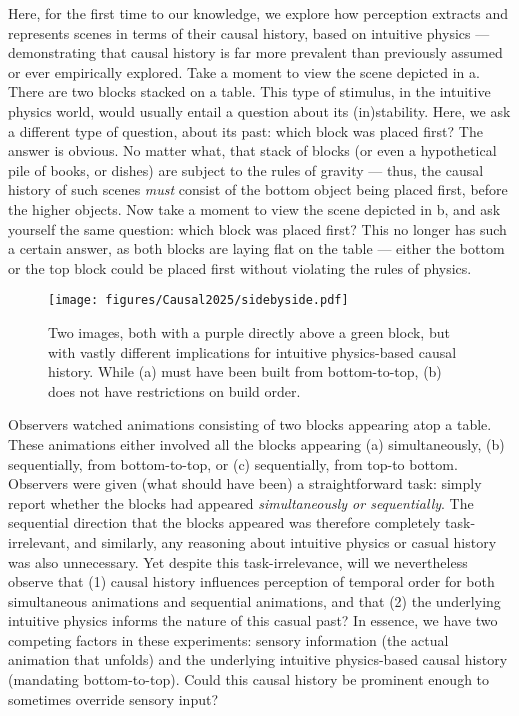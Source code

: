 Here, for the first time to our knowledge, we explore how perception extracts and represents scenes in terms of their causal history, based on intuitive physics --- demonstrating that causal history is far more prevalent than previously assumed or ever empirically explored.  Take a moment to view the scene depicted in a.  There are two blocks stacked on a table.  This type of stimulus, in the intuitive physics world, would usually entail a question about its (in)stability.  Here, we ask a different type of question, about its past: which block was placed first?  The answer is obvious.  No matter what, that stack of blocks (or even a hypothetical pile of books, or dishes) are subject to the rules of gravity --- thus, the causal history of such scenes \textit{must} consist of the bottom object being placed first, before the higher objects.  Now take a moment to view the scene depicted in b, and ask yourself the same question: which block was placed first?  This no longer has such a certain answer, as both blocks are laying flat on the table --- either the bottom or the top block could be placed first without violating the rules of physics.  

\begin{figure}
    \centering
    \texttt{[image: figures/Causal2025/sidebyside.pdf]}
    \caption
    {Two images, both with a purple directly above a green block, but with vastly different implications for intuitive physics-based causal history.  While (a) must have been built from bottom-to-top, (b) does not have restrictions on build order.}
    \label{fig:CausalHist_2}
\end{figure}

Observers watched animations consisting of two blocks appearing atop a table.  These animations either involved all the blocks appearing (a) simultaneously, (b) sequentially, from bottom-to-top, or (c) sequentially, from top-to bottom.  Observers were given (what should have been) a straightforward task:  simply report whether the blocks had appeared \textit{simultaneously or sequentially}.  The sequential direction that the blocks appeared was therefore completely task-irrelevant, and similarly, any reasoning about intuitive physics or casual history was also unnecessary.  Yet despite this task-irrelevance, will we nevertheless observe that (1) causal history influences perception of temporal order for both simultaneous animations and sequential animations, and that (2) the underlying intuitive physics informs the nature of this casual past?  In essence, we have two competing factors in these experiments:  sensory information (the actual animation that unfolds) and the underlying intuitive physics-based causal history (mandating bottom-to-top).  Could this causal history be prominent enough to sometimes override sensory input?

